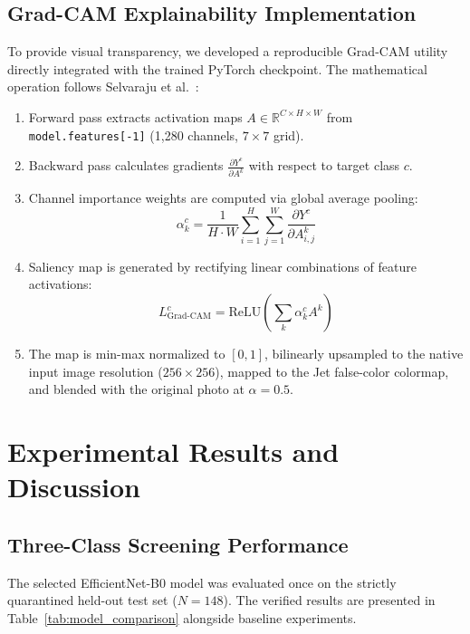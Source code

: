 \documentclass[conference]{IEEEtran}
\begin{document}
\subsection{Grad-CAM Explainability Implementation}
To provide visual transparency, we developed a reproducible Grad-CAM utility directly integrated with the trained PyTorch checkpoint. The mathematical operation follows Selvaraju et al.~\cite{selvaraju2017gradcam}:
\begin{enumerate}
    \item Forward pass extracts activation maps $A \in \mathbb{R}^{C \times H \times W}$ from \texttt{model.features[-1]} (1,280 channels, $7 \times 7$ grid).
    \item Backward pass calculates gradients $\frac{\partial Y^c}{\partial A^k}$ with respect to target class $c$.
    \item Channel importance weights are computed via global average pooling:
    \begin{equation}
    \alpha_k^c = \frac{1}{H \cdot W} \sum_{i=1}^H \sum_{j=1}^W \frac{\partial Y^c}{\partial A_{i,j}^k}
    \end{equation}
    \item Saliency map is generated by rectifying linear combinations of feature activations:
    \begin{equation}
    L_{\text{Grad-CAM}}^c = \text{ReLU}\left(\sum_k \alpha_k^c A^k\right)
    \end{equation}
    \item The map is min-max normalized to $[0, 1]$, bilinearly upsampled to the native input image resolution ($256 \times 256$), mapped to the Jet false-color colormap, and blended with the original photo at $\alpha = 0.5$.
\end{enumerate}

\section{Experimental Results and Discussion}

\subsection{Three-Class Screening Performance}
The selected EfficientNet-B0 model was evaluated once on the strictly quarantined held-out test set ($N = 148$). The verified results are presented in Table~\ref{tab:model_comparison} alongside baseline experiments.
\end{document}
